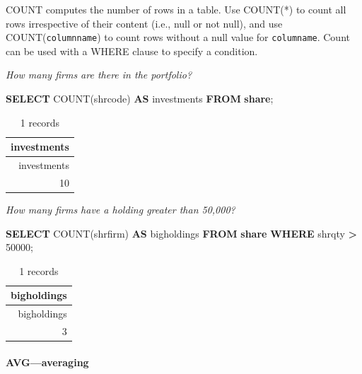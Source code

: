 \documentclass[
]{article}
\newenvironment{Shaded}{\begin{snugshade}}{\end{snugshade}}
\newcommand{\DecValTok}[1]{\textcolor[rgb]{0.00,0.00,0.81}{#1}}
\newcommand{\FunctionTok}[1]{\textcolor[rgb]{0.00,0.00,0.00}{#1}}
\newcommand{\KeywordTok}[1]{\textcolor[rgb]{0.13,0.29,0.53}{\textbf{#1}}}
\newcommand{\NormalTok}[1]{#1}
\newcommand{\OperatorTok}[1]{\textcolor[rgb]{0.81,0.36,0.00}{\textbf{#1}}}
\begin{document}
COUNT computes the number of rows in a table. Use COUNT(*) to count all
rows irrespective of their content (i.e., null or not null), and use
COUNT(\texttt{columnname}) to count rows without a null value for
\texttt{columname}. Count can be used with a WHERE clause to specify a
condition.

\emph{How many firms are there in the portfolio?}

\begin{Shaded}
\begin{Highlighting}[]
\KeywordTok{SELECT} \FunctionTok{COUNT}\NormalTok{(shrcode) }\KeywordTok{AS}\NormalTok{ investments }\KeywordTok{FROM} \KeywordTok{share}\NormalTok{;}
\end{Highlighting}
\end{Shaded}

\begin{longtable}[]{@{}r@{}}
\caption{1 records}\tabularnewline
\toprule()
investments \\
\midrule()
\endfirsthead
\toprule()
investments \\
\midrule()
\endhead
10 \\
\bottomrule()
\end{longtable}

\emph{How many firms have a holding greater than 50,000?}

\begin{Shaded}
\begin{Highlighting}[]
\KeywordTok{SELECT} \FunctionTok{COUNT}\NormalTok{(shrfirm) }\KeywordTok{AS}\NormalTok{ bigholdings }\KeywordTok{FROM} \KeywordTok{share} \KeywordTok{WHERE}\NormalTok{ shrqty }\OperatorTok{\textgreater{}} \DecValTok{50000}\NormalTok{;}
\end{Highlighting}
\end{Shaded}

\begin{longtable}[]{@{}r@{}}
\caption{1 records}\tabularnewline
\toprule()
bigholdings \\
\midrule()
\endfirsthead
\toprule()
bigholdings \\
\midrule()
\endhead
3 \\
\bottomrule()
\end{longtable}

\hypertarget{avgaveraging}{%
\paragraph{AVG---averaging}\label{avgaveraging}}
\end{document}
